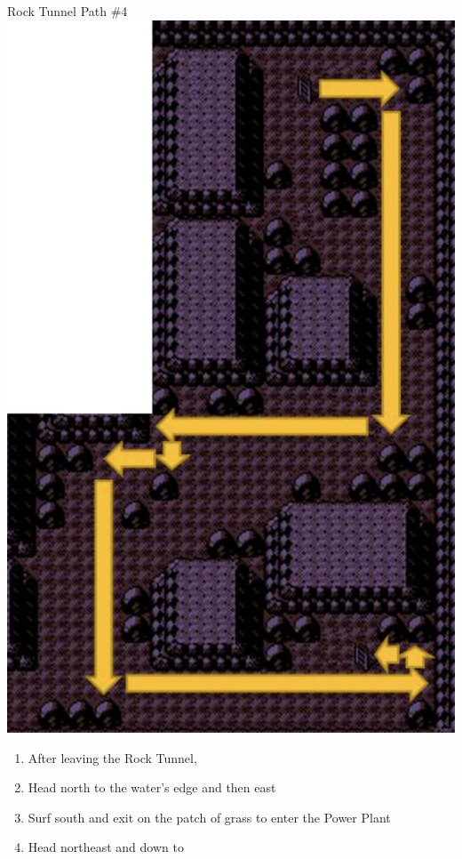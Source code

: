 \begin{paracol}{2}
\newpage
\begin{story}{Rock Tunnel Path \#4}
	\varwb
	\includegraphics[scale=0.35]{../Graphics/22. Rock Tunnel 4.png}
	\varwe
\end{story}

\switchcolumn
\begin{enumerate}[resume]
	\item After leaving the Rock Tunnel, 
	\item Head north to the water's edge and then east
	\item Surf south and exit on the patch of grass to enter the Power Plant
	\item Head northeast and down to 
\end{enumerate} 


\end{paracol}
